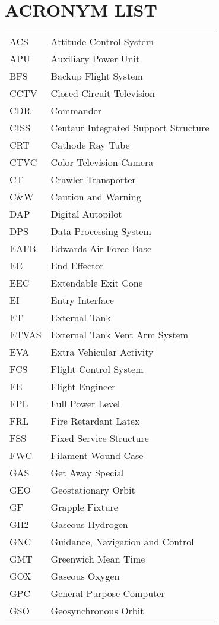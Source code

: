 \documentclass[Space_Shuttle_Vessel_Manual.tex]{subfiles}
\begin{document}
\section{ACRONYM LIST}
\label{sec:acronym-list}
\noindent
\begin{longtable}{l l }
ACS & Attitude Control System\\
APU & Auxiliary Power Unit\\
BFS & Backup Flight System\\
CCTV & Closed-Circuit Television\\
CDR & Commander\\
CISS & Centaur Integrated Support Structure\\
CRT & Cathode Ray Tube\\
CTVC & Color Television Camera\\
CT & Crawler Transporter\\
C\&W & Caution and Warning\\
DAP & Digital Autopilot\\
DPS & Data Processing System\\
EAFB & Edwards Air Force Base\\
EE & End Effector\\
EEC & Extendable Exit Cone\\
EI & Entry Interface\\
ET & External Tank\\
ETVAS & External Tank Vent Arm System\\
EVA & Extra Vehicular Activity\\
FCS & Flight Control System\\
FE & Flight Engineer\\
FPL & Full Power Level\\
FRL & Fire Retardant Latex\\
FSS & Fixed Service Structure\\
FWC & Filament Wound Case\\
GAS & Get Away Special\\
GEO & Geostationary Orbit\\
GF & Grapple Fixture\\
GH2 & Gaseous Hydrogen\\
GNC & Guidance, Navigation and Control\\
GMT & Greenwich Mean Time\\
GOX & Gaseous Oxygen\\
GPC & General Purpose Computer\\
GSO & Geosynchronous Orbit\\

\end{longtable}
\end{document}
